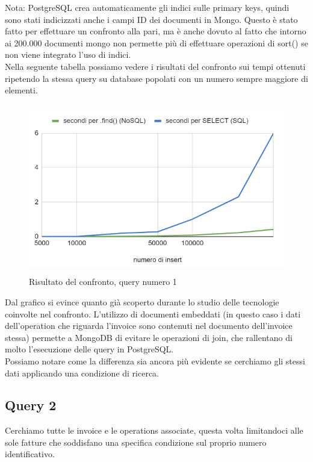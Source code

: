 \noindent Nota: PostgreSQL crea automaticamente gli indici sulle primary keys, quindi sono stati indicizzati anche i campi ID dei documenti in Mongo. Questo è stato fatto per effettuare un confronto alla pari, ma è anche dovuto al fatto che intorno ai 200.000 documenti mongo non permette più di effettuare operazioni di sort() se non viene integrato l'uso di indici.\\

\noindent Nella seguente tabella possiamo vedere i risultati del confronto sui tempi ottenuti ripetendo la stessa query su database popolati con un numero sempre maggiore di elementi.\\

\begin{figure}[htbp]
\begin{center}
\includegraphics[height=20em]{immagini/query/query1_results.png}
\caption{Risultato del confronto, query numero 1}
\end{center}
\end{figure}

\noindent Dal grafico si evince quanto già scoperto durante lo studio delle tecnologie coinvolte nel confronto. L'utilizzo di documenti embeddati (in questo caso i dati dell'operation che riguarda l'invoice sono contenuti nel documento dell'invoice stessa) permette a MongoDB di evitare le operazioni di join, che rallentano di molto l'esecuzione delle query in PostgreSQL.\\

\noindent Possiamo notare come la differenza sia ancora più evidente se cerchiamo gli stessi dati applicando una condizione di ricerca.\\


\subsection{Query 2}
Cerchiamo tutte le invoice e le operations associate, questa volta limitandoci alle sole fatture che soddisfano una specifica condizione sul proprio numero identificativo.\\

